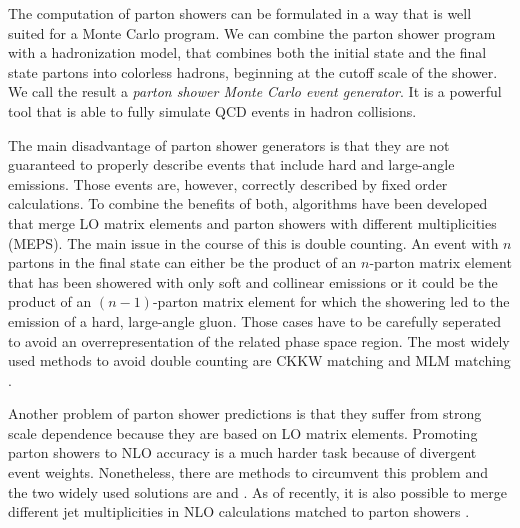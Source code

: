 The computation of parton showers can be formulated in a way that is well suited for a Monte Carlo program.
We can combine the parton shower program with a hadronization model, that combines both the initial state and the final state partons into colorless hadrons, beginning at the cutoff scale of the shower. We call the result a \textit{parton shower Monte Carlo event generator}.
It is a powerful tool that is able to fully simulate QCD events in hadron collisions.

The main disadvantage of parton shower generators is that they are not guaranteed to properly describe events that include hard and large-angle emissions.
Those events are, however, correctly described by fixed order calculations.
To combine the benefits of both, algorithms have been developed that merge LO matrix elements and parton showers with different multiplicities (MEPS).
The main issue in the course of this is double counting.
An event with $n$ partons in the final state can either be the product of an $n$-parton matrix element that has been showered with only soft and collinear emissions or it could be the product of an $(n-1)$-parton matrix element for which the showering led to the emission of a hard, large-angle gluon.
Those cases have to be carefully seperated to avoid an overrepresentation of the related phase space region.
The most widely used methods to avoid double counting are CKKW matching \cite{ckkw_a,ckkw_b} and MLM matching \cite{mlm_a,mlm_b}.

Another problem of parton shower predictions is that they suffer from strong scale dependence because they are based on LO matrix elements.
Promoting parton showers to NLO accuracy is a much harder task because of divergent event weights.
Nonetheless, there are methods to circumvent this problem and the two widely used solutions are \mcatnlo{} \cite{mcatnlo} and \powheg{} \cite{powheg_a,powheg_b,powheg_c}.
As of recently, it is also possible to merge different jet multiplicities in NLO calculations matched to parton showers \cite{nlomerging1,nlomerging2,nlomerging3,nlomerging4,nlomerging5}.


